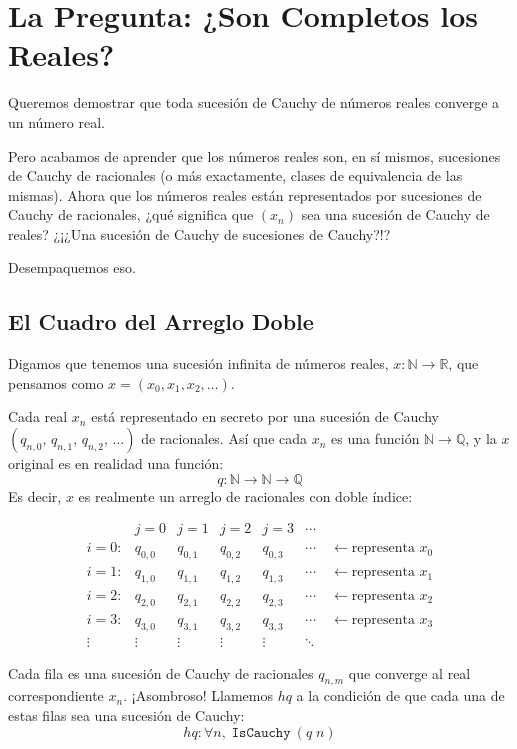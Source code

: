 \section{La Pregunta: ¿Son Completos los Reales?}

Queremos demostrar que toda sucesión de Cauchy de números reales converge a un
número real.

Pero acabamos de aprender que los números reales son, en sí mismos, sucesiones de
Cauchy de racionales (o más exactamente, clases de equivalencia de las mismas).
Ahora que los números reales están representados por sucesiones de Cauchy de
racionales, ¿qué significa que $(x_n)$ sea una sucesión de Cauchy de reales?
¿¡¿Una sucesión de Cauchy de sucesiones de Cauchy?!?

Desempaquemos eso.

\subsection{El Cuadro del Arreglo Doble}

Digamos que tenemos una sucesión infinita de números reales,
$x : \mathbb{N} \to \mathbb{R}$, que pensamos como $x = (x_0, x_1, x_2, \ldots)$.

Cada real $x_n$ está representado en secreto por una sucesión de Cauchy
$(q_{n,0},\, q_{n,1},\, q_{n,2},\, \ldots)$ de racionales. Así que cada $x_n$ es
una función $\mathbb{N} \to \mathbb{Q}$, y la $x$ original es en realidad una
función:
\[
  q : \mathbb{N} \to \mathbb{N} \to \mathbb{Q}
\]
Es decir, $x$ es realmente un arreglo de racionales con doble índice:

\[
\begin{array}{c|ccccl}
  & j=0 & j=1 & j=2 & j=3 & \cdots \\
\hline
i=0: & q_{0,0} & q_{0,1} & q_{0,2} & q_{0,3} & \cdots \quad \leftarrow \text{representa } x_0 \\
i=1: & q_{1,0} & q_{1,1} & q_{1,2} & q_{1,3} & \cdots \quad \leftarrow \text{representa } x_1 \\
i=2: & q_{2,0} & q_{2,1} & q_{2,2} & q_{2,3} & \cdots \quad \leftarrow \text{representa } x_2 \\
i=3: & q_{3,0} & q_{3,1} & q_{3,2} & q_{3,3} & \cdots \quad \leftarrow \text{representa } x_3 \\
\vdots & \vdots & \vdots & \vdots & \vdots & \ddots
\end{array}
\]

Cada fila es una sucesión de Cauchy de racionales $q_{n,m}$ que converge al real
correspondiente $x_n$. ¡Asombroso! Llamemos $\mathit{hq}$ a la condición de que
cada una de estas filas sea una sucesión de Cauchy:
\[
  \mathit{hq} : \forall n,\; \texttt{IsCauchy}\ (q\; n)
\]


